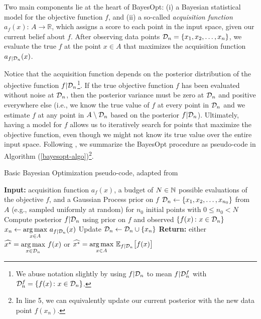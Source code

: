 Two main components lie at the heart of BayesOpt: (i) a Bayesian statistical model for the objective function $f$, and (ii) a so-called \textit{acquisition function} $a_f(x){:\,}A\rightarrow\mathbb{R}$, which assigns a score to each point in the input space, given our current belief about $f$. After observing data points $\mathcal{D}_n=\{x_1, x_2, \dots, x_n\}$, we evaluate the true $f$ at the point $x\in A$ that maximizes the acquisition function $a_{f\vert\mathcal{D}_n}(x)$.

Notice that the acquisition function depends on the posterior distribution of the objective function $f\vert \mathcal{D}_n$\footnote{We abuse notation slightly by using $f\vert \mathcal{D}_n$ to mean $f\vert \mathcal{D}^f_n$ with $\mathcal{D}^f_n = \{f(x){\,:\ } x \in \mathcal{D}_n\}$.}. If the true objective function $f$ has been evaluated without noise at $\mathcal{D}_n$, then the posterior variance must be zero at $\mathcal{D}_n$ and positive everywhere else (i.e., we know the true value of $f$ at every point in $\mathcal{D}_n$ and we estimate $f$ at any point in $A\setminus\mathcal{D}_n$ based on the posterior $f\vert\mathcal{D}_n$). Ultimately, having a model for $f$ allows us to iteratively search for points that maximize the objective function, even though we might not know its true value over the entire input space. Following , we summarize the BayesOpt procedure as pseudo-code in Algorithm (\ref{bayesopt-algo})\footnote{In line 5, we can equivalently update our current posterior with the new data point $f(x_n)$.}.

\begin{algorithm}
\caption{Basic Bayesian Optimization pseudo-code, adapted from }\label{bayesopt-algo}
\begin{algorithmic}[1]\onehalfspacing
{}
\State \textbf{Input:} acquisition function $a_f(x)$, a budget of $N\in\mathbb{N}$ possible evaluations of the objective $f$, and a Gaussian Process prior on $f$
\State $\mathcal{D}_{n}\gets\{x_1, x_2, \dots, x_{n_0}\}$ from $A$ (e.g., sampled uniformly at random) for $n_0$ initial points with $0 \leq n_0 < N$
\State Compute posterior $f\vert\mathcal{D}_n$ using prior on $f$ and observed $\{f(x){\,:\ } x\in \mathcal{D}_n \}$
\State $x_n\gets \underset{x\in A}{\arg\max}\ a_{f\vert\mathcal{D}_n}(x)$
\State Update $\mathcal{D}_{n}\gets\mathcal{D}_{n}\cup \{x_n\}$
\EndFor
\State \textbf{Return:} either $\widehat{x^*}=\underset{x\in \calD_n}{\arg\max}\ f(x)$ or $\widehat{x^*}=\underset{x\in A}{\arg\max}\ \mathbb{E}_{f\vert\mathcal{D}_n}\big[f(x)\big]$
\EndProcedure
\end{algorithmic}
\end{algorithm}


